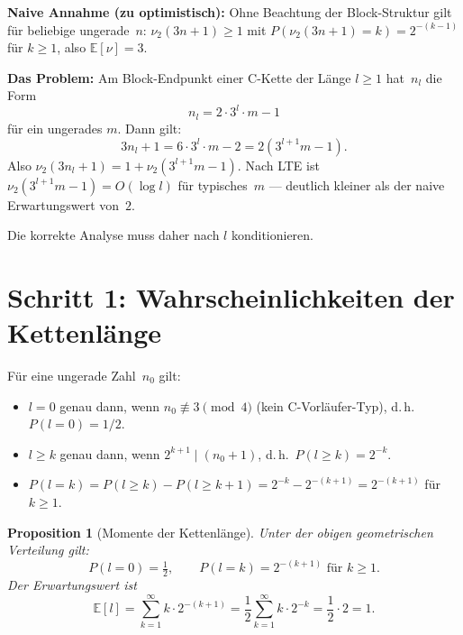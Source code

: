 \documentclass[12pt,a4paper]{article}
\newtheorem{proposition}[definition]{Proposition}
\newcommand{\vii}{\nu_2}
\newcommand{\E}{\mathbb{E}}
\begin{document}
\begin{tcolorbox}[lte]
\textbf{Naive Annahme (zu optimistisch):}
Ohne Beachtung der Block-Struktur gilt für beliebige ungerade~$n$:
$\vii(3n+1) \geq 1$ mit $P(\vii(3n+1) = k) = 2^{-(k-1)}$ für $k \geq 1$,
also $\E[\nu] = 3$.

\medskip
\textbf{Das Problem:}
Am Block-Endpunkt einer C-Kette der Länge $l \geq 1$ hat~$n_l$ die Form
\[
  n_l = 2 \cdot 3^l \cdot m - 1
\]
für ein ungerades $m$.
Dann gilt:
\[
  3n_l + 1 = 6 \cdot 3^l \cdot m - 2 = 2(3^{l+1} m - 1).
\]
Also $\vii(3n_l + 1) = 1 + \vii(3^{l+1}m - 1)$.
Nach LTE ist $\vii(3^{l+1}m - 1) = O(\log l)$ für typisches~$m$
--- deutlich kleiner als der naive Erwartungswert von~$2$.
\end{tcolorbox}

Die korrekte Analyse muss daher nach $l$ konditionieren.

\section{Schritt 1: Wahrscheinlichkeiten der Kettenlänge}
\label{sec:wahrscheinlichkeiten}

\begin{tcolorbox}[ergebnis, title={Bewiesenes Ergebnis -- Kettenlängenverteilung}]
Für eine ungerade Zahl~$n_0$ gilt:
\begin{itemize}[noitemsep]
  \item $l = 0$ genau dann, wenn $n_0 \not\equiv 3 \pmod{4}$
        (kein C-Vorläufer-Typ), d.\,h.\ $P(l=0) = 1/2$.
  \item $l \geq k$ genau dann, wenn $2^{k+1} \mid (n_0+1)$,
        d.\,h.\ $P(l \geq k) = 2^{-k}$.
  \item $P(l = k) = P(l \geq k) - P(l \geq k{+}1) = 2^{-k} - 2^{-(k+1)} = 2^{-(k+1)}$
        für $k \geq 1$.
\end{itemize}
\end{tcolorbox}

\begin{proposition}[Momente der Kettenlänge]
\label{prop:momente}
Unter der obigen geometrischen Verteilung gilt:
\[
  P(l=0) = \tfrac{1}{2}, \qquad
  P(l=k) = 2^{-(k+1)} \text{ für } k \geq 1.
\]
Der Erwartungswert ist
\[
  \E[l] = \sum_{k=1}^{\infty} k \cdot 2^{-(k+1)}
         = \frac{1}{2} \sum_{k=1}^{\infty} k \cdot 2^{-k}
         = \frac{1}{2} \cdot 2 = 1.
\]
\end{proposition}
\end{document}
